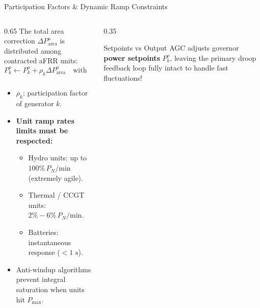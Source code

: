 \begin{frame}{Participation Factors \& Dynamic Ramp Constraints}
\begin{columns}[T]
\begin{column}{0.65\textwidth}
    \footnotesize
    The total area correction $\Delta P_{\text{area}}^o$ is distributed among contracted aFRR units:
    \begin{equation*}
        P_k^o \leftarrow P_k^o + \rho_k \Delta P_{\text{area}}^o \quad \text{with} \quad \sum_{k} \rho_k = 1
    \end{equation*}
    \begin{itemize}\setlength{\itemsep}{2pt}
        \item $\rho_k$: participation factor of generator $k$.
        \item \textbf{Unit ramp rates limits must be respected:}
        \begin{itemize}
            \item Hydro units: up to $100\% \, P_N / \text{min}$ (extremely agile).
            \item Thermal / CCGT units: $2\% - 6\% \, P_N / \text{min}$.
            \item Batteries: instantaneous response ($< 1\text{ s}$).
        \end{itemize}
        \item Anti-windup algorithms prevent integral saturation when units hit $P_{\max}$.
    \end{itemize}
\end{column}
\begin{column}{0.35\textwidth}
    \begin{block}{Setpoints vs Output}
    \scriptsize
    AGC adjusts governor \textbf{power setpoints} $P_k^o$, leaving the primary droop feedback loop fully intact to handle fast fluctuations!
    \end{block}
\end{column}
\end{columns}
\end{frame}

